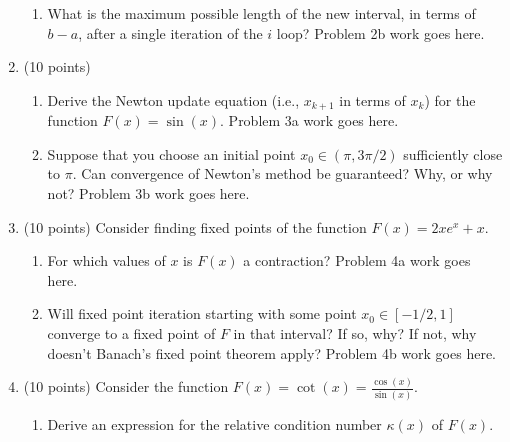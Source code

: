 \documentclass{article}
\begin{document}
\begin{enumerate}
\begin{enumerate}
        
        \item What is the maximum possible length of the new interval, in terms of $b − a$, after a single iteration of the $i$ loop?
        \newline
        \newline
        Problem 2b work goes here.
        
    \end{enumerate}
    \item (10 points)
    \begin{enumerate}
        \item Derive the Newton update equation (i.e., $x_{k+1}$ in terms of $x_k$) for the function $F(x) = \sin(x)$.
        \newline
        \newline
        Problem 3a work goes here.
        \item Suppose that you choose an initial point $x_0\in (\pi, 3\pi/2)$ sufficiently close to $\pi$. Can convergence of Newton’s method be guaranteed? Why, or why not?
        \newline
        \newline
        Problem 3b work goes here.
    \end{enumerate}
    \item (10 points) Consider finding fixed points of the function $F(x) = 2xe^x + x$.
    \begin{enumerate}
        \item For which values of $x$ is $F(x)$ a contraction?
        \newline
        \newline
        Problem 4a work goes here.
        \item Will fixed point iteration starting with some point $x_0\in [−1/2, 1]$ converge to a fixed point of $F$ in that interval? If so, why? If not, why doesn’t Banach’s fixed point theorem apply?
        \newline
        \newline
        Problem 4b work goes here.
    \end{enumerate}
    \item (10 points) Consider the function $F(x) = \cot(x) = \frac{\cos(x)}{\sin(x)}$.
    \begin{enumerate}
        \item Derive an expression for the relative condition number $\kappa(x)$ of $F(x)$.
        \newline
        \newline

\end{enumerate}
\end{enumerate}
\end{document}
